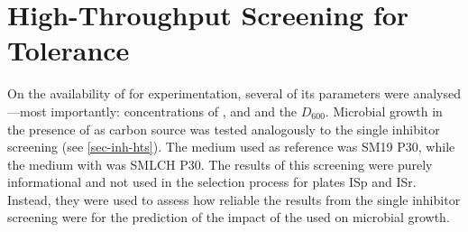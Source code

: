 \section{High-Throughput Screening for \LCH{} Tolerance\label{sec-lch-hts}}
On the availability of \lch{} for experimentation, several of its parameters were analysed---most importantly: concentrations of \glc{}, \xyl{} and \fur{} and the $D_{600}$. Microbial growth in the presence of \lch{} as carbon source was tested analogously to the single inhibitor screening (see \vref{sec-inh-hts}). The medium used as reference was SM19 P30, while the medium with \lch{} was SMLCH P30. The results of this screening were purely informational and not used in the selection process for plates ISp and ISr. Instead, they were used to assess how reliable the results from the single inhibitor screening were for the prediction of the impact of the \lch{} used on microbial growth.

